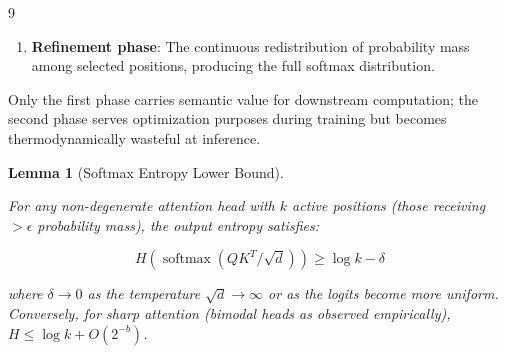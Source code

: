 \documentclass[11pt]{article}
\newtheorem{lemma}[theorem]{Lemma}
\theoremstyle{definition}
\newcommand{\softmax}{\operatorname{softmax}}
\begin{document}
\begin{thebibliography}{9}
{{{\begin{enumerate}
    \item \textbf{Refinement phase}: The continuous redistribution of probability mass among selected positions, producing the full softmax distribution.






\end{enumerate}













Only the first phase carries semantic value for downstream computation; the second phase serves optimization purposes during training but becomes thermodynamically wasteful at inference.













\begin{lemma}[Softmax Entropy Lower Bound]






\label{lem:softmax-entropy}






For any non-degenerate attention head with $k$ active positions (those receiving $> \epsilon$ probability mass), the output entropy satisfies:






\[






H(\softmax(QK^T/\sqrt{d})) \geq \log k - \delta






\]






where $\delta \to 0$ as the temperature $\sqrt{d} \to \infty$ or as the logits become more uniform. Conversely, for sharp attention (bimodal heads as observed empirically), $H \leq \log k + O(2^{-b})$.






\end{lemma}













}}}
\end{thebibliography}
\end{document}
